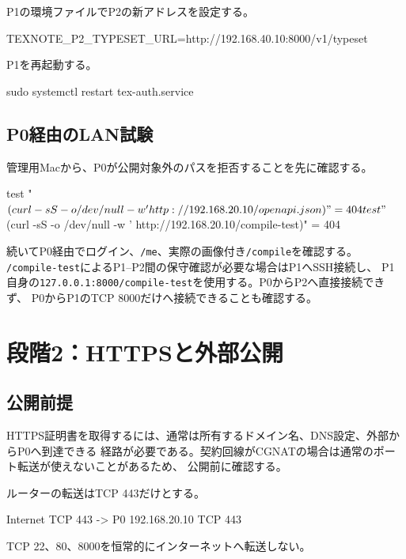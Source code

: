 \documentclass[uplatex,a4paper,11pt]{jsarticle}
\begin{document}
P1の環境ファイルでP2の新アドレスを設定する。

\begin{command}
TEXNOTE_P2_TYPESET_URL=http://192.168.40.10:8000/v1/typeset
\end{command}

P1を再起動する。

\begin{command}
sudo systemctl restart tex-auth.service
\end{command}

\subsection{P0経由のLAN試験}

管理用Macから、P0が公開対象外のパスを拒否することを先に確認する。

\begin{command}
test "$(curl -sS -o /dev/null -w '%
  http://192.168.20.10/openapi.json)" = 404
test "$(curl -sS -o /dev/null -w '%
  http://192.168.20.10/compile-test)" = 404
\end{command}

続いてP0経由でログイン、\texttt{/me}、実際の画像付き\texttt{/compile}を確認する。
\texttt{/compile-test}によるP1--P2間の保守確認が必要な場合はP1へSSH接続し、
P1自身の\texttt{127.0.0.1:8000/compile-test}を使用する。P0からP2へ直接接続できず、
P0からP1のTCP 8000だけへ接続できることも確認する。

\section{段階2：HTTPSと外部公開}

\subsection{公開前提}

HTTPS証明書を取得するには、通常は所有するドメイン名、DNS設定、外部からP0へ到達できる
経路が必要である。契約回線がCGNATの場合は通常のポート転送が使えないことがあるため、
公開前に確認する。

ルーターの転送はTCP 443だけとする。

\begin{command}
Internet TCP 443 -> P0 192.168.20.10 TCP 443
\end{command}

TCP 22、80、8000を恒常的にインターネットへ転送しない。
\end{document}

